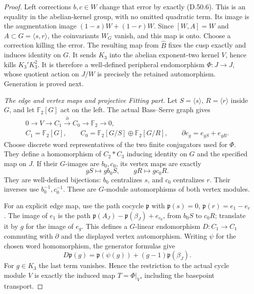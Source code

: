 \begin{proof}
Left corrections \(b,c\in W\) change that error
by exactly (D.50.6). This is an equality in the
abelian-kernel group, with no omitted quadratic
term. Its image is the augmentation image
\((1-s)W+(1-r)W\). Since \([W,A]=W\) and
\(A\subset G=\langle s,r\rangle\), the coinvariants
\(W_G\) vanish, and this map is onto. Choose a
correction killing the error. The resulting map
from \(\widehat B\) fixes the cusp exactly and
induces identity on \(G\). It sends \(K_3\) into
the abelian exponent-two kernel \(V\), hence kills
\(K_3'K_3^2\). It is therefore a well-defined
peripheral endomorphism \(\Phi:J\to J\), whose
quotient action on \(J/W\) is precisely the
retained automorphism. Generation is proved next.

\emph{The edge and vertex maps and projective Fitting part.}
Let \(S=\langle s\rangle\), \(R=\langle r\rangle\)
inside \(G\), and let \(\mathbb F_2[G]\) act on
the left. The actual Bass--Serre graph gives
\[
 \begin{gathered}
 0\longrightarrow V\longrightarrow C_1
 \xrightarrow{\partial} C_0
 \longrightarrow\mathbb F_2\longrightarrow0,\\
 C_1=\mathbb F_2[G],\qquad
 C_0=\mathbb F_2[G/S]\oplus\mathbb F_2[G/R],\qquad
 \partial e_g=e_{gS}+e_{gR}.
 \end{gathered}
 \tag{D.50.11}
\]
Choose discrete word representatives of the two
finite conjugators used for \(\Phi\). They define
a homomorphism of \(C_2*C_3\) inducing identity
on \(G\) and the specified map on \(J\).
If their \(G\)-images are \(b_0,c_0\), its vertex
maps are exactly
\[
       gS\longmapsto gb_0S,\qquad
       gR\longmapsto gc_0R.
 \tag{D.50.12}
\]
They are well-defined bijections: \(b_0\) centralizes
\(s\), and \(c_0\) centralizes \(r\). Their inverses
use \(b_0^{-1},c_0^{-1}\). These are \(G\)-module
automorphisms of both vertex modules.

For an explicit edge map, use the path cocycle
\(\mathfrak p\) with
\(\mathfrak p(s)=0\),
\(\mathfrak p(r)=e_1-e_r\).
The image of \(e_1\) is the path
\(\mathfrak p(A_J)-\mathfrak p(\beta_J)+e_{c_0}\),
from \(b_0S\) to \(c_0R\); translate it by \(g\)
for the image of \(e_g\). This defines a \(G\)-linear
endomorphism \(D:C_1\to C_1\) commuting with
\(\partial\) and the displayed vertex automorphism.
Writing \(\psi\) for the chosen word homomorphism,
the generator formulas give
\[
 D\mathfrak p(g)=\mathfrak p(\psi(g))
                         +(g-1)\mathfrak p(\beta_J).
\]
For \(g\in K_3\) the last term vanishes. Hence
the restriction to the actual cycle module \(V\)
is exactly the induced map \(T=\Phi|_V\), including
the basepoint transport.


\end{proof}
